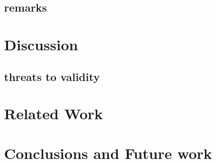 \documentclass{sig-alternate}
\begin{document}
\subsection{remarks}


\section{Discussion}

\subsection{threats to validity}

\section{Related Work}

\section{Conclusions and Future work}


%

%
%
\end{document}
